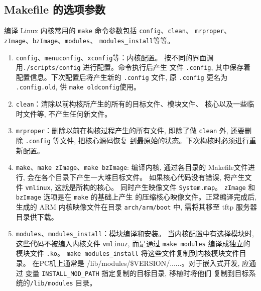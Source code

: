 \subsection{Makefile 的选项参数}
编译 Linux 内核常用的 \verb|make| 命令参数包括 \verb|config|、\verb|clean|、
\verb|mrproper|、\verb|zImage|、\verb|bzImage|、\verb|modules|、
\verb|modules_install|等等。
\begin{enumerate}
    \item \verb|config|、\verb|menuconfig|、\verb|xconfig|等：内核配置。
        按不同的界面调用\verb|./scripts/config| 进行配置。命令执行后产生
        文件 \verb|.config|, 其中保存着配置信息。下次配置后将产生新的
        \verb|.config| 文件, 原 \verb|.config| 更名为
        \verb|.config.old|, 供 \verb|make oldconfig|使用。
    \item \verb|clean|：清除以前构核所产生的所有的目标文件、模块文件、
        核心以及一些临时文件等, 不产生任何新文件。
    \item \verb|mrproper|：删除以前在构核过程产生的所有文件, 即除了做
        \verb|clean| 外, 还要删除 \verb|.config| 等文件, 把核心源码恢复
        到最原始的状态。下次构核时必须进行重新配置。
    \item \verb|make|、\verb|make zImage|、\verb|make bzImage|: 编译内核,
        通过各目录的 Makefile文件进行, 会在各个目录下产生一大堆目标文件。
        如果核心代码没有错误, 将产生文件 \verb|vmlinux|, 这就是所构的核心。
        同时产生映像文件 \verb|System.map|。
        \verb|zImage| 和 \verb|bzImage| 选项是在 \verb|make| 的基础上产生
        的压缩核心映像文件。正常编译完成后, 生成的 ARM 内核映像文件在目录
        \verb|arch/arm/boot| 中, 需将其移至 tftp 服务器目录供下载。
    \item \verb|modules|、\verb|modules_install|：模块编译和安装。
        当内核配置中有选择模块时, 这些代码不被编入内核文件 \verb|vmlinuz|,
        而是通过 \verb|make modules| 编译成独立的模块文件 \verb|.ko|。
        \verb|make modules_install| 将这些文件复制到内核模块文件目录。
        在PC机上通常是 /lib/modules/\$VERSION/......。对于嵌入式开发, 应通过
        变量 \verb|INSTALL_MOD_PATH| 指定复制的目标目录, 移植时将他们
        复制到目标系统的\verb|/lib/modules| 目录。
\end{enumerate}

